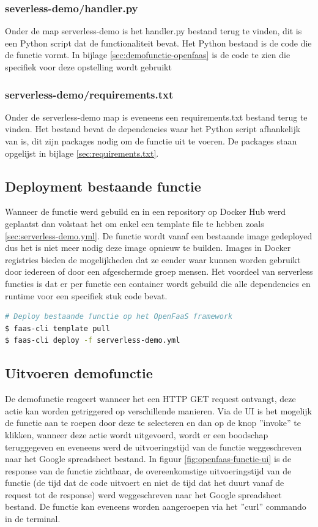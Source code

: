 \subsubsection{severless-demo/handler.py}
Onder de map serverless-demo is het handler.py bestand terug te vinden, dit is een Python script dat de functionaliteit bevat. Het Python bestand is de code die de functie vormt. In bijlage \ref{sec:demofunctie-openfaas} is de code te zien die specifiek voor deze opstelling wordt gebruikt

\subsubsection{serverless-demo/requirements.txt}
Onder de serverless-demo map is eveneens een requirements.txt bestand terug te vinden. Het bestand bevat de dependencies waar het Python script afhankelijk van is, dit zijn packages nodig om de functie uit te voeren. De packages staan opgelijst in bijlage \ref{sec:requirements.txt}.

\subsection{Deployment bestaande functie}
Wanneer de functie werd gebuild en in een repository op Docker Hub werd geplaatst dan volstaat het om enkel een template file te hebben zoals \ref{sec:serverless-demo.yml}. De functie wordt vanaf een bestaande image gedeployed dus het is niet meer nodig deze image opnieuw te builden. Images in Docker registries bieden de mogelijkheden dat ze eender waar kunnen worden gebruikt door iedereen of door een afgeschermde groep mensen. Het voordeel van serverless functies is dat er per functie een container wordt gebuild die alle dependencies en runtime voor een specifiek stuk code bevat.

\begin{lstlisting}[language=bash]
# Deploy bestaande functie op het OpenFaaS framework
$ faas-cli template pull
$ faas-cli deploy -f serverless-demo.yml
\end{lstlisting}

\subsection{Uitvoeren demofunctie}
\label{sec:openfaas-uitvoeren-functie}
De demofunctie reageert wanneer het een HTTP GET request ontvangt, deze actie kan worden getriggered op verschillende manieren. Via de UI is het mogelijk de functie aan te roepen door deze te selecteren en dan op de knop ''invoke'' te klikken, wanneer deze actie wordt uitgevoerd, wordt er een boodschap teruggegeven en eveneens werd de uitvoeringstijd van de functie weggeschreven naar het Google spreadsheet bestand. In figuur \ref{fig:openfaas-functie-ui} is de response van de functie zichtbaar, de overeenkomstige uitvoeringstijd van de functie (de tijd dat de code uitvoert en niet de tijd dat het duurt vanaf de request tot de response) werd weggeschreven naar het Google spreadsheet bestand.
De functie kan eveneens worden aangeroepen via het ''curl'' commando in de terminal.

